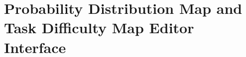 \chapter[Probability Distribution Map and Task Difficulty Map Editor Interface]{Probability Distribution Map and Task Difficulty Map Editor Interface}
\label{chap:MapEdit}